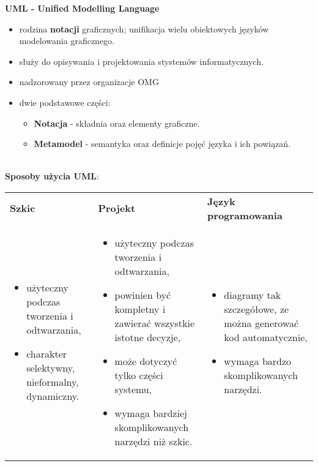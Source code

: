 \documentclass[../main.tex]{subfiles}
\begin{document}
    \textbf{UML - Unified Modelling Language}
    \begin{itemize}
        \item rodzina \textbf{notacji} graficznych; unifikacja wielu obiektowych języków modelowania graficznego.
        \item służy do opisywania i projektowania stystemów informatycznych.
        \item nadzorowany przez organizacje OMG
        \item dwie podstawowe części:
        \begin{itemize}
            \item \textbf{Notacja} - składnia oraz elementy graficzne.
            \item \textbf{Metamodel} - semantyka oraz definicje pojęć języka i ich powiązań.
        \end{itemize}
    \end{itemize}
    \hfill \\
    \textbf{Sposoby użycia UML}:

    \begin{table}[H]
        \begin{center}
            \begin{tabular}{  p{5cm} p{5cm}  p{5cm} }
                \toprule
                \textbf{Szkic} & \textbf{Projekt} & \textbf{Język programowania} \\

                \cmidrule(r){1-1}\cmidrule(rl){2-2}\cmidrule(l){3-3}

                \begin{itemize}
                    \item użyteczny podczas tworzenia i odtwarzania,
                    \item charakter selektywny, nieformalny, dynamiczny.
                \end{itemize}
                &
                \begin{itemize}
                    \item użyteczny podczas tworzenia i odtwarzania,
                    \item powinien być kompletny i zawierać wszystkie istotne decyzje,
                    \item może dotyczyć tylko części systemu,
                    \item wymaga bardziej skomplikowanych narzędzi niż szkic.
                \end{itemize}
                &
                \begin{itemize}
                    \item diagramy tak szczegółowe, ze można generować kod automatycznie,
                    \item wymaga bardzo skomplikowanych narzędzi.
                \end{itemize}
                \\


                \bottomrule
            \end{tabular}
        \end{center}
    \end{table}
\end{document}
